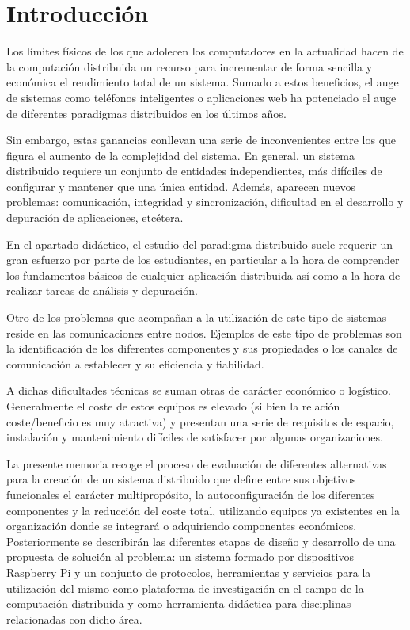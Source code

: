 \chapter{Introducción}

Los límites físicos de los que adolecen los computadores en la actualidad \cite{seth:physical} hacen de la computación distribuida un recurso para incrementar de forma sencilla y económica el rendimiento total de un sistema. Sumado a estos beneficios, el auge de sistemas como teléfonos inteligentes o aplicaciones web ha potenciado el auge de diferentes paradigmas distribuidos en los últimos años. 

Sin embargo, estas ganancias conllevan una serie de inconvenientes entre los que figura el aumento de la complejidad del sistema. En general, un sistema distribuido requiere un conjunto de entidades independientes, más difíciles de configurar y mantener que una única entidad. Además, aparecen nuevos problemas: comunicación, integridad y sincronización, dificultad en el desarrollo y depuración de aplicaciones, etcétera.

En el apartado didáctico, el estudio del paradigma distribuido suele requerir un gran esfuerzo por parte de los estudiantes, en particular a la hora de comprender los fundamentos básicos de cualquier aplicación distribuida así como a la hora de realizar tareas de análisis y depuración.

Otro de los problemas que acompañan a la utilización de este tipo de sistemas reside en las comunicaciones entre nodos. Ejemplos de este tipo de problemas son la identificación de los diferentes componentes y sus propiedades o los canales de comunicación a establecer y su eficiencia y fiabilidad.

A dichas dificultades técnicas se suman otras de carácter económico o logístico. Generalmente el coste de estos equipos es elevado (si bien la relación coste/beneficio es muy atractiva) y presentan una serie de requisitos de espacio, instalación y mantenimiento difíciles de satisfacer por algunas organizaciones.

La presente memoria recoge el proceso de evaluación de diferentes alternativas para la creación de un sistema distribuido que define entre sus objetivos funcionales el carácter multipropósito, la autoconfiguración de los diferentes componentes y la reducción del coste total, utilizando equipos ya existentes en la organización donde se integrará o adquiriendo componentes económicos. Posteriormente se describirán las diferentes etapas de diseño y desarrollo de una propuesta de solución al problema: un sistema formado por dispositivos Raspberry Pi y un conjunto de protocolos, herramientas y servicios para la utilización del mismo como plataforma de investigación en el campo de la computación distribuida y como herramienta didáctica para disciplinas relacionadas con dicho área.

